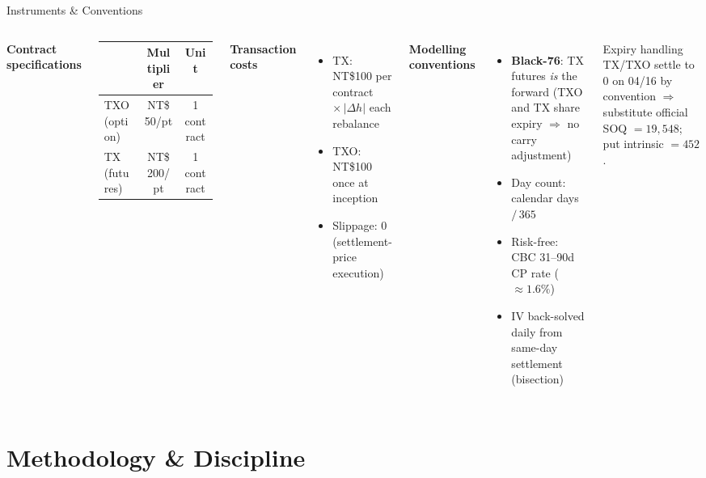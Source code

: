 \documentclass[aspectratio=169,t]{beamer}
\newcommand{\nt}[1]{NT\$#1}
\begin{document}
\begin{frame}{Instruments \& Conventions}
  \begin{columns}[T]
      \textbf{Contract specifications}
      \vspace{0.3em}
      \begin{tabular}{lcc}
        \toprule
        & \textbf{Multiplier} & \textbf{Unit} \\
        \midrule
        TXO (option) & \nt{50}/pt & 1 contract \\
        TX (futures) & \nt{200}/pt & 1 contract \\
        \bottomrule
      \end{tabular}
      \vspace{0.8em}

      \textbf{Transaction costs}
      \begin{itemize}\small
        \item TX: \nt{100} per contract $\times\,|\Delta h|$ each rebalance
        \item TXO: \nt{100} once at inception
        \item Slippage: 0 (settlement-price execution)
      \end{itemize}
      \textbf{Modelling conventions}
      \begin{itemize}\small
        \item \textbf{Black-76}: TX futures \emph{is} the forward (TXO and TX share expiry $\Rightarrow$ no carry adjustment)
        \item Day count: calendar days $/\,365$
        \item Risk-free: CBC 31--90d CP rate ($\approx 1.6\%$)
        \item IV back-solved daily from same-day settlement (bisection)
      \end{itemize}
      \begin{block}{Expiry handling}
        \small TX/TXO settle to 0 on 04/16 by convention $\Rightarrow$ substitute official SOQ $=19{,}548$; put intrinsic $=452$.
      \end{block}
  \end{columns}
\end{frame}

\section{Methodology \& Discipline}
\end{document}
